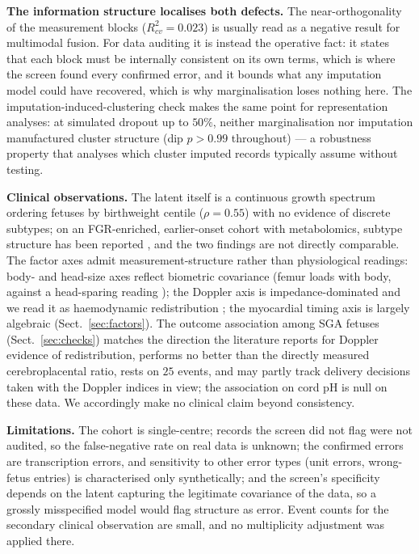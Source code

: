 \documentclass[a4paper,fleqn]{cas-sc}
\begin{document}
\noindent\textbf{The information structure localises both defects.}
The near-orthogonality of the measurement blocks ($R^2_{cv}=0.023$) is usually read as a negative result for multimodal fusion. For data auditing it is instead the operative fact: it states that each block must be internally consistent on its own terms, which is where the screen found every confirmed error, and it bounds what any imputation model could have recovered, which is why marginalisation loses nothing here. The imputation-induced-clustering check makes the same point for representation analyses: at simulated dropout up to $50\%$, neither marginalisation nor imputation manufactured cluster structure (dip $p>0.99$ throughout) --- a robustness property that analyses which cluster imputed records typically assume without testing.

\noindent\textbf{Clinical observations.}
The latent itself is a continuous growth spectrum ordering fetuses by birthweight centile ($\rho=0.55$) with no evidence of discrete subtypes; on an FGR-enriched, earlier-onset cohort with metabolomics, subtype structure has been reported \cite{ref:miranda}, and the two findings are not directly comparable. The factor axes admit measurement-structure rather than physiological readings: body- and head-size axes reflect biometric covariance (femur loads with body, against a head-sparing reading \cite{ref:quinton}); the Doppler axis is impedance-dominated and we read it as haemodynamic redistribution \cite{ref:cpr}; the myocardial timing axis is largely algebraic (Sect.~\ref{sec:factors}). The outcome association among SGA fetuses (Sect.~\ref{sec:checks}) matches the direction the literature reports for Doppler evidence of redistribution, performs no better than the directly measured cerebroplacental ratio, rests on $25$ events, and may partly track delivery decisions taken with the Doppler indices in view; the association on cord pH is null on these data. We accordingly make no clinical claim beyond consistency.

\noindent\textbf{Limitations.}
The cohort is single-centre; records the screen did not flag were not audited, so the false-negative rate on real data is unknown; the confirmed errors are transcription errors, and sensitivity to other error types (unit errors, wrong-fetus entries) is characterised only synthetically; and the screen's specificity depends on the latent capturing the legitimate covariance of the data, so a grossly misspecified model would flag structure as error. Event counts for the secondary clinical observation are small, and no multiplicity adjustment was applied there.
\end{document}

